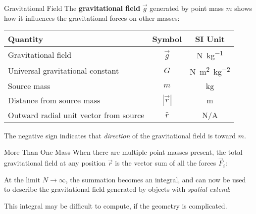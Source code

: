 \documentclass[12pt,compress,aspectratio=169]{beamer}
\begin{document}
\begin{frame}{Gravitational Field}
  The \textbf{gravitational field} $\vec g$ generated by point mass $m$
  shows how it influences the gravitational forces on other masses:

  \begin{center}
    \begin{tabular}{l|c|c}
      \rowcolor{pink}
      \textbf{Quantity} & \textbf{Symbol} & \textbf{SI Unit} \\ \hline
      Gravitational field       & $\vec g$ & \si{\newton\per\kilo\gram}\\
      Universal gravitational constant
      & $G$ & \si{\newton\metre\squared\per\kilo\gram\squared} \\
      Source mass               & $m$ & \si{\kilo\gram} \\
      Distance from source mass & $|\vec r|$ & \si\metre \\
      Outward radial unit vector from source & $\hat r$ & N/A
    \end{tabular}
  \end{center}
  The negative sign indicates that \emph{direction} of the gravitational field
  is toward $m$.
\end{frame}



\begin{frame}{More Than One Mass}
  When there are multiple point masses present, the total gravitational field
  at any position $\vec r$ is the vector sum of all the forces $\vec F_i$:
    

  At the limit $N\rightarrow\infty$, the summation becomes an integral, and can
  now be used to describe the gravitational field generated by objects with
  \emph{spatial extend}:

  
  This integral may be difficult to compute, if the geometry is complicated.
\end{frame}
\end{document}
